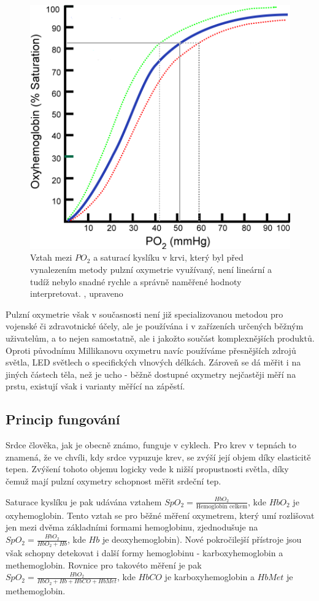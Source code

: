 \begin{figure}[H]
  \includegraphics[scale=1, center]{Kapitoly/Teoreticka/Obrazky/TlakKysliku.png}
  \caption [Vztah mezi $PO_2$ a saturací kyslíku v krvi]{Vztah mezi $PO_2$ a saturací kyslíku v krvi, který byl před vynalezením metody pulzní oxymetrie využívaný, není lineární a tudíž nebylo snadné rychle a správně naměřené hodnoty interpretovat. \citep{ratznium_2006}, upraveno}
  \label{fig:PO2}
\end{figure}
\par Pulzní oxymetrie však v současnosti není již specializovanou metodou pro vojenské či zdravotnické účely, ale je používána i v zařízeních určených běžným uživatelům, a to nejen samostatně, ale i jakožto součást komplexnějších produktů. Oproti původnímu Millikanovu oxymetru navíc používáme přesnějších zdrojů světla, LED světlech o specifických vlnových délkách. Zároveň se dá měřit i na jiných částech těla, než je ucho - běžně dostupné oxymetry nejčastěji měří na prstu, existují však i varianty měřící na zápěstí.
\subsection {Princip fungování}
Srdce člověka, jak je obecně známo, funguje v cyklech. Pro krev v tepnách to znamená, že ve chvíli, kdy srdce vypuzuje krev, se zvýší její objem díky elasticitě tepen. Zvýšení tohoto objemu logicky vede k nižší propustnosti světla, díky čemuž mají pulzní oxymetry schopnost měřit srdeční tep.
\par Saturace kyslíku je pak udávána vztahem $SpO_2 = \frac{HbO_2}{\text{Hemoglobin celkem}}$, kde $HbO_2$ je oxyhemoglobin. Tento vztah se pro běžné měření oxymetrem, který umí rozlišovat jen mezi dvěma základními formami hemoglobinu, zjednodušuje na $SpO_2 = \frac{HbO_2}{HbO_2+Hb}$, kde $Hb$ je deoxyhemoglobin). Nové pokročilejší přístroje jsou však schopny detekovat i další formy hemoglobinu - karboxyhemoglobin a methemoglobin. Rovnice pro takovéto měření je pak $SpO_2 = \frac{HbO_2}{HbO_2+Hb+HbCO+HbMet}$, kde $HbCO$ je karboxyhemoglobin a $HbMet$ je methemoglobin. 
